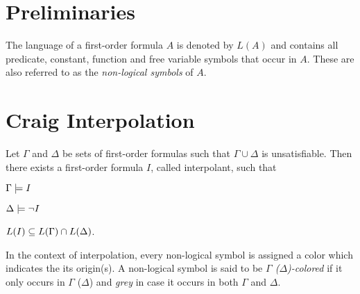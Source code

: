 \section{Preliminaries}

The language of a first-order formula $A$ is denoted by $L(A)$ and contains all predicate, constant, function and free variable symbols that occur in $A$.
These are also referred to as the \emph{non-logical symbols} of $A$.

\section{Craig Interpolation}


\begin{samepage}
	\begin{thm}[Interpolation]
		\label{thm:interpolation}
		Let $\Gamma$ and $\Delta$ be sets of first-order formulas such that $ \Gamma \cup \Delta $ is unsatisfiable.
		Then there exists a first-order formula $I$, called interpolant, such that \nopagebreak[4]
		\begin{compactenum}
		\item $ \Gamma \models I$ \label{int_1}
		\item $ \Delta \models \lnot I$  \label{int_2}
		\item $ L(I) \subseteq L(\Gamma) \cap L(\Delta)$.  \label{int_3}
			\thmqed
		\end{compactenum}
	\end{thm}
\end{samepage}

In the context of interpolation, every non-logical symbol is assigned a color which indicates the its origin(s). 
A non-logical symbol is said to be \emph{$\Gamma$ ($\Delta$)-colored} if it only occurs in $\Gamma$ ($\Delta$) and \emph{grey} in case it occurs in both $\Gamma$ and $\Delta$.
